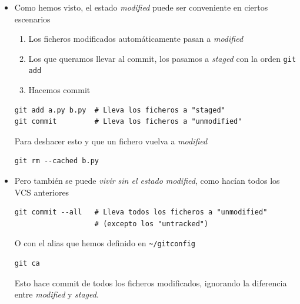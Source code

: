 \documentclass[ucs]{beamer}
\begin{document}
\begin{frame}[fragile]
\frametitle{}
\begin{itemize}
\item
Como hemos visto, el estado \emph{modified} puede ser conveniente en ciertos escenarios

\begin{enumerate}
\item
Los ficheros modificados automáticamente pasan a
\emph{modified}
\item
Los que queramos llevar al commit, los pasamos a \emph{staged} con la orden \verb|git add|
\item
Hacemos commit
\end{enumerate}


  \begin{footnotesize}
  \begin{verbatim}
git add a.py b.py  # Lleva los ficheros a "staged"
git commit         # Lleva los ficheros a "unmodified"
  \end{verbatim}
  \end{footnotesize}

Para deshacer esto y que un fichero vuelva a 
\emph{modified}

  \begin{footnotesize}
  \begin{verbatim}
git rm --cached b.py
  \end{verbatim}
  \end{footnotesize}

\item
Pero también se puede \emph{vivir sin el estado modified}, como hacían todos los VCS anteriores

  \begin{footnotesize}
  \begin{verbatim}
git commit --all   # Lleva todos los ficheros a "unmodified"
                   # (excepto los "untracked")
  \end{verbatim}
  \end{footnotesize}
O con el alias que hemos definido en \verb|~/gitconfig|
  \begin{footnotesize}
  \begin{verbatim}
git ca
  \end{verbatim}
  \end{footnotesize}

Esto hace commit de todos los ficheros modificados, ignorando la diferencia entre
\emph{modified} y \emph{staged}. 

\end{itemize}

\end{frame}
\end{document}
